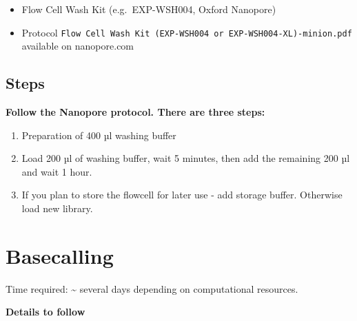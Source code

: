 \documentclass[
]{book}
\providecommand{\tightlist}{%
  \setlength{\itemsep}{0pt}\setlength{\parskip}{0pt}}
\begin{document}
\begin{itemize}
\tightlist
\item
  Flow Cell Wash Kit (e.g.~EXP-WSH004, Oxford Nanopore)
\item
  Protocol \texttt{Flow\ Cell\ Wash\ Kit\ (EXP-WSH004\ or\ EXP-WSH004-XL)-minion.pdf} available on nanopore.com
\end{itemize}

\subsection{Steps}\label{steps-4}

\textbf{Follow the Nanopore protocol. There are three steps:}

\begin{enumerate}
\def\labelenumi{\arabic{enumi}.}
\tightlist
\item
  Preparation of 400 µl washing buffer
\item
  Load 200 µl of washing buffer, wait 5 minutes, then add the remaining 200 µl and wait 1 hour.
\item
  If you plan to store the flowcell for later use - add storage buffer. Otherwise load new library.
\end{enumerate}

\section{Basecalling}\label{basecalling}

Time required: \textasciitilde{} several days depending on computational resources.

\textbf{Details to follow}

  
\end{document}
